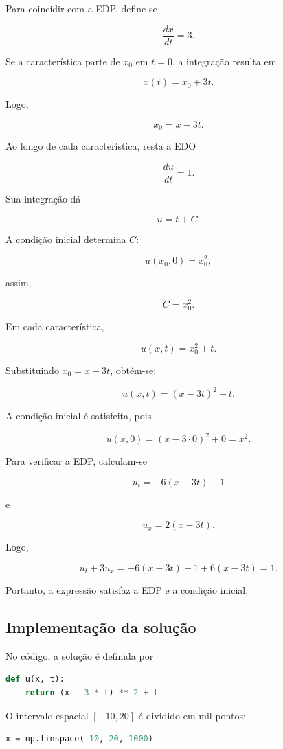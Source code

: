 \documentclass[
    12pt,
    oneside,
    a4paper,
    english,
    brazilian,
    chapter=TITLE,
    sumario=tradicional
]{abntex2}
\begin{document}
Para coincidir com a EDP, define-se

\[
    \frac{dx}{dt}=3.
\]

Se a característica parte de $x_0$ em $t=0$, a integração resulta em

\[
    x(t)=x_0+3t.
\]

Logo,

\[
    x_0=x-3t.
\]

Ao longo de cada característica, resta a EDO

\[
    \frac{du}{dt}=1.
\]

Sua integração dá

\[
    u=t+C.
\]

A condição inicial determina $C$:

\[
    u(x_0,0)=x_0^2,
\]

assim,

\[
    C=x_0^2.
\]

Em cada característica,

\[
    u(x,t)=x_0^2+t.
\]

Substituindo $x_0=x-3t$, obtém-se:

\[
    \boxed{
        u(x,t)=(x-3t)^2+t
    }.
\]

A condição inicial é satisfeita, pois

\[
    u(x,0)
    =
    (x-3\cdot 0)^2+0
    =
    x^2.
\]

Para verificar a EDP, calculam-se

\[
    u_t=-6(x-3t)+1
\]

e

\[
    u_x=2(x-3t).
\]

Logo,

\[
    u_t+3u_x
    =
    -6(x-3t)+1+6(x-3t)
    =
    1.
\]

Portanto, a expressão satisfaz a EDP e a condição inicial.

\subsection{Implementação da solução}

No código, a solução é definida por

\begin{lstlisting}[language=Python]
def u(x, t):
    return (x - 3 * t) ** 2 + t
\end{lstlisting}

O intervalo espacial $[-10,20]$ é dividido em mil pontos:

\begin{lstlisting}[language=Python]
x = np.linspace(-10, 20, 1000)
\end{lstlisting}
\end{document}

